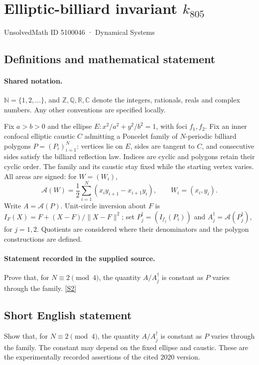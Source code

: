 \documentclass[11pt]{article}
\newcommand{\sref}[2]{\hyperlink{source:#1:#2}{[S#2]}}
\begin{document}
\setcounter{section}{5100045}
\section{Elliptic-billiard invariant $k_{805}$}\label{5100046}
{\small\sffamily UnsolvedMath ID 5100046 · Dynamical Systems}
\subsection{Definitions and mathematical statement}

\paragraph{Shared notation.}$\mathbb N=\{1,2,\ldots\}$, and $\mathbb Z,\mathbb Q,\mathbb R,\mathbb C$ denote the integers, rationals, reals and complex numbers. Any other conventions are specified locally.


Fix $a>b>0$ and the ellipse $E:x^2/a^2+y^2/b^2=1$, with foci $f_1,f_2$. Fix an inner confocal elliptic caustic $C$ admitting a Poncelet family of $N$-periodic billiard polygons $P=(P_i)_{i=1}^N$: vertices lie on $E$, sides are tangent to $C$, and consecutive sides satisfy the billiard reflection law. Indices are cyclic and polygons retain their cyclic order. The family and its caustic stay fixed while the starting vertex varies. All areas are signed: for $W=(W_i)$,
\[\mathcal A(W)=\frac12\sum_{i=1}^N(x_i y_{i+1}-x_{i+1}y_i),\qquad W_i=(x_i,y_i).\]
Write $A=\mathcal A(P)$. Unit-circle inversion about $F$ is $I_F(X)=F+(X-F)/\lVert X-F\rVert^2$; set $P_j^\dagger=(I_{f_j}(P_i))$ and $A_j^\dagger=\mathcal A(P_j^\dagger)$, for $j=1,2$. Quotients are considered where their denominators and the polygon constructions are defined.
\paragraph{Statement recorded in the supplied source.}
Prove that, for $N\equiv2\pmod4$, the quantity $A/A_j^\dagger$ is constant as $P$ varies through the family. \sref{5100046}{2}
\subsection{Short English statement}
Show that, for $N\equiv2\pmod4$, the quantity $A/A_j^\dagger$ is constant as $P$ varies through the family. The constant may depend on the fixed ellipse and caustic. These are the experimentally recorded assertions of the cited 2020 version.
\end{document}
